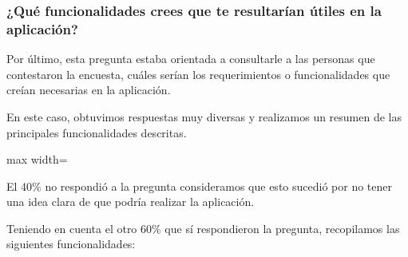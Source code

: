 \documentclass[a4paper,12pt]{article}
\newcommand{\saltolinea}{\par\vspace{\baselineskip}}
\begin{document}
    \subsubsection{¿Qué funcionalidades crees que te resultarían útiles en la aplicación?}
    \par Por último, esta pregunta estaba orientada a consultarle a las personas que contestaron la encuesta, cuáles serían los requerimientos o funcionalidades que creían necesarias en la aplicación.
    \par En este caso, obtuvimos respuestas muy diversas y realizamos un resumen de las principales funcionalidades descritas. 
    \newline
        \begin{adjustbox}{max width=\textwidth}
        \end{adjustbox} 
    \saltolinea
    \par El 40\% no respondió a la pregunta consideramos que esto sucedió por no tener una idea clara de que podría realizar la aplicación.
    \par Teniendo en cuenta el otro 60\% que sí respondieron la pregunta, recopilamos las siguientes funcionalidades:
\end{document}
